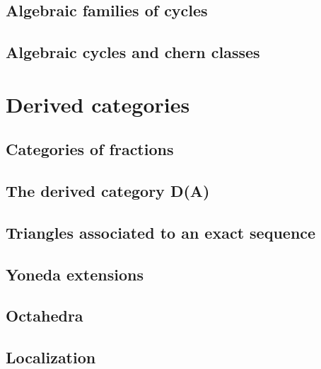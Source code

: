 \documentclass[5pt]{article}
\theoremstyle{definition}
\theoremstyle{remark}
\begin{document}
	\subsection{Algebraic families of cycles}
	
	\subsection{Algebraic cycles and chern classes}
	
	\newpage
	
	\section{Derived categories}
	
	\subsection{Categories of fractions}
	
	\subsection{The derived category D(A)} 
	
	\subsection{Triangles associated to an exact sequence}
	
	\subsection{Yoneda extensions}
	
	\subsection{Octahedra}
	
	\subsection{Localization}
	
\end{document}

